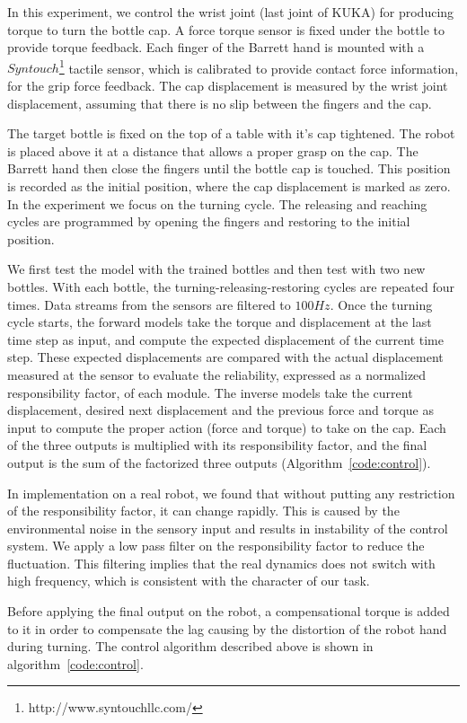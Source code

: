 In this experiment, we control the wrist joint (last joint of KUKA) for producing torque to turn the bottle cap. A force torque sensor is fixed under the bottle to provide torque feedback. Each finger of the Barrett hand is mounted with a $Syntouch$\footnote{http://www.syntouchllc.com/} tactile sensor, which is calibrated to provide contact force information, for the grip force feedback. The cap displacement is measured by the wrist joint displacement, assuming that there is no slip between the fingers and the cap.

The target bottle is fixed on the top of a table with it's cap tightened. The robot is placed above it at a distance that allows a proper grasp on the cap. The Barrett hand then close the fingers until the bottle cap is touched. This position is recorded as the initial position, where the cap displacement is marked as zero. In the experiment we focus on the turning cycle. The releasing and reaching cycles are programmed by opening the fingers and restoring to the initial position.

We first test the model with the trained bottles and then test with two new bottles. With each bottle, the turning-releasing-restoring cycles are repeated four times. Data streams from the sensors are filtered to $100Hz$. Once the turning cycle starts, the forward models take the torque and displacement at the last time step as input, and compute the expected displacement of the current time step. These expected displacements are compared with the actual displacement measured at the sensor to evaluate the reliability, expressed as a normalized responsibility factor, of each module. The inverse models take the current displacement, desired next displacement and the previous force and torque as input to compute the proper action (force and torque) to take on the cap. Each of the three outputs is multiplied with its responsibility factor, and the final output is the sum of the factorized three outputs (Algorithm~\ref{code:control}).

In implementation on a real robot, we found that without putting any restriction of the responsibility factor, it can change rapidly. This is caused by the environmental noise in the sensory input and results in instability of the control system. We apply a low pass filter on the responsibility factor to reduce the fluctuation. This filtering implies that the real dynamics does not switch with high frequency, which is consistent with the character of our task.


Before applying the final output on the robot, a compensational torque is added to it in order to compensate the lag causing by the distortion of the robot hand during turning. The control algorithm described above is shown in algorithm~\ref{code:control}.



